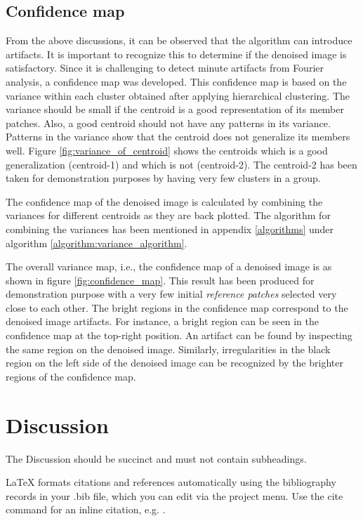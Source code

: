 \documentclass[fleqn,10pt]{wlscirep}
\begin{document}
\subsection*{Confidence map}
From the above discussions, it can be observed that the algorithm can introduce artifacts. It is important to recognize this to determine if the denoised image is satisfactory. Since it is challenging to detect minute artifacts from Fourier analysis, a confidence map was developed. This confidence map is based on the variance within each cluster obtained after applying hierarchical clustering. The variance should be small if the centroid is a good representation of its member patches. Also, a good centroid should not have
any patterns in its variance. Patterns in the variance show that the centroid does not generalize its members well. Figure \ref{fig:variance_of_centroid} shows the centroids which is a good generalization (centroid-1) and which is not (centroid-2). The centroid-2 has been taken for demonstration purposes by having very few clusters in a group. 

The confidence map of the denoised image is calculated by combining the variances for different centroids as they are back plotted. The algorithm \cite{chan1982updating} for combining the variances has been mentioned in appendix \ref{algorithms} under algorithm \ref{algorithm:variance_algorithm}.

The overall variance map, i.e., the confidence map of a denoised image is as shown in figure \ref{fig:confidence_map}. This result has been produced for demonstration purpose with a very few initial \textit{reference patches} selected very close to each other. The bright regions in the confidence map correspond to the denoised image artifacts. For instance, a bright region can be seen in the confidence map at the top-right position. An artifact can be found by inspecting the same region on the denoised image. Similarly, irregularities in the black region on the left side of the denoised image can be recognized by the brighter regions of the confidence map.

\section*{Discussion}

The Discussion should be succinct and must not contain subheadings.
 



\noindent LaTeX formats citations and references automatically using the bibliography records in your .bib file, which you can edit via the project menu. Use the cite command for an inline citation, e.g.  \cite{Hao:gidmaps:2014}.
\end{document}
